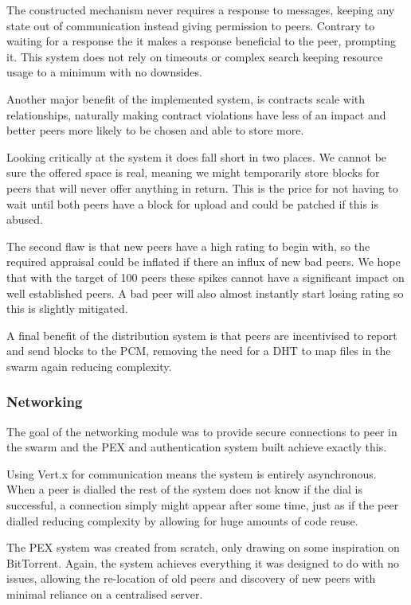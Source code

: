 \documentclass[11pt, a4paper, twocolumn, twoside]{report}
\begin{document}
The constructed mechanism never requires a response to messages, keeping any state out of communication instead giving permission to peers. Contrary to waiting for a response the it makes a response beneficial to the peer, prompting it. This system does not rely on timeouts or complex search keeping resource usage to a minimum with no downsides.

Another major benefit of the implemented system, is contracts scale with relationships, naturally making contract violations have less of an impact and better peers more likely to be chosen and able to store more.

Looking critically at the system it does fall short in two places. We cannot be sure the  offered space is real, meaning we might temporarily store blocks for peers that will never offer anything in return. This is the price for not having to wait until both peers have a block for upload and could be patched if this is abused.

The second flaw is that new peers have a high rating to begin with, so the required appraisal could be inflated if there an influx of new bad peers. We hope that with the target of 100 peers these spikes cannot have a significant impact on well established peers. A bad peer will also almost instantly start losing rating so this is slightly mitigated.

A final benefit of the distribution system is that peers are incentivised to report and send blocks to the PCM, removing the need for a DHT to map files in the swarm again reducing complexity.

\subsubsection{Networking}

The goal of the networking module was to provide secure connections to peer in the swarm and the PEX and authentication system built achieve exactly this.

Using Vert.x for communication means the system is entirely asynchronous. When a peer is dialled the rest of the system does not know if the dial is successful, a connection simply might appear after some time, just as if the peer dialled reducing complexity by allowing for huge amounts of code reuse.

The PEX system was created from scratch, only drawing on some inspiration on BitTorrent. Again, the system achieves everything it was designed to do with no issues, allowing the re-location of old peers and discovery of new peers with minimal reliance on a centralised server.
\end{document}
